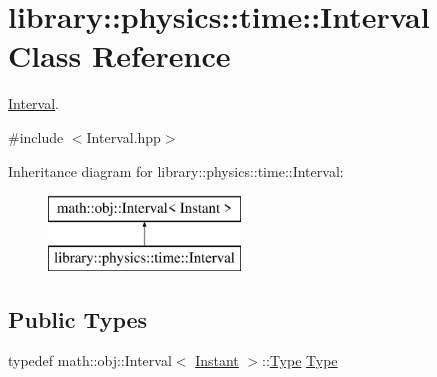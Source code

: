 \hypertarget{classlibrary_1_1physics_1_1time_1_1_interval}{}\section{library\+:\+:physics\+:\+:time\+:\+:Interval Class Reference}
\label{classlibrary_1_1physics_1_1time_1_1_interval}


\hyperlink{classlibrary_1_1physics_1_1time_1_1_interval}{Interval}.  




{\ttfamily \#include $<$Interval.\+hpp$>$}

Inheritance diagram for library\+:\+:physics\+:\+:time\+:\+:Interval\+:\begin{figure}[H]
\begin{center}
\leavevmode
\includegraphics[height=2.000000cm]{classlibrary_1_1physics_1_1time_1_1_interval}
\end{center}
\end{figure}
\subsection*{Public Types}
\begin{DoxyCompactItemize}
\item 
typedef math\+::obj\+::\+Interval$<$ \hyperlink{classlibrary_1_1physics_1_1time_1_1_instant}{Instant} $>$\+::\hyperlink{classlibrary_1_1physics_1_1time_1_1_interval_aba490e7120a05be7b17a4d8076f25d48}{Type} \hyperlink{classlibrary_1_1physics_1_1time_1_1_interval_aba490e7120a05be7b17a4d8076f25d48}{Type}
\end{DoxyCompactItemize}

